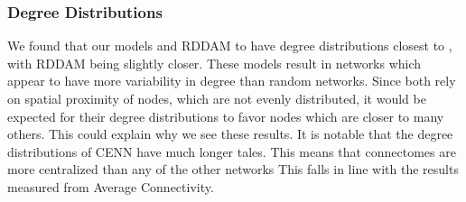 \subsubsection{Degree Distributions} 
We found that our models and RDDAM to have degree distributions closest to \ce, with RDDAM being slightly closer. 
These models result in networks which appear to have more variability in degree than random networks. 
Since both rely on spatial proximity of nodes, which are not evenly distributed, it would be expected for their degree distributions to favor nodes which are closer to many others. 
This could explain why we see these results. 
It is notable that the degree distributions of CENN have much longer tales. 
This means that \ce connectomes are more centralized than any of the other networks 
This falls in line with the results measured from Average Connectivity. 